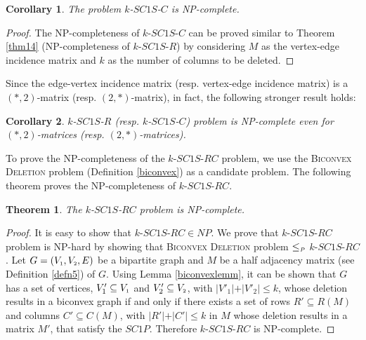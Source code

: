\documentclass[review, 1p]{elsarticle}
\newtheorem{theorem}{Theorem}
\newtheorem{corollary}{Corollary}
\begin{document}
\begin{corollary}
The problem $k$-$SC1S$-$C$ is NP-complete.
\end{corollary}
\begin{proof}
The NP-completeness of $k$-$SC1S$-$C$ can be proved similar to Theorem \ref{thm14} (NP-completeness of $k$-$SC1S$-$R$) by considering $M$ as the vertex-edge incidence matrix and $k$ as the number of columns to be deleted. 
\end{proof}
\noindent Since the edge-vertex incidence matrix (resp. vertex-edge incidence matrix) is a $(*,2)$-matrix (resp. $(2,*)$-matrix), in fact, the following stronger result holds: \begin{corollary}
$k$-$SC1S$-$R$ (resp. $k$-$SC1S$-$C$) problem is NP-complete even for $(*,2)$-matrices (resp. $(2,*)$-matrices).
\end{corollary}
\noindent To prove the NP-completeness of the $k$-$SC1S$-$RC$ problem, we use the \textsc{Biconvex Deletion} problem (Definition \ref{biconvex}) as a candidate problem. The following theorem proves the NP-completeness of $k$-$SC1S$-$RC$. 
\begin{theorem}
The $k$-$SC1S$-$RC$ problem is NP-complete.
\end{theorem}
\begin{proof}
It is easy to show that $k$-$SC1S$-$RC \in NP$. We prove that $k$-$SC1S$-$RC$ problem is NP-hard by showing that \textsc{Biconvex Deletion} problem $\leq_{\mathsmaller {P}}$  $k$-$SC1S$-$RC$. Let $G=(V_{\mathsmaller{1}}, V_{\mathsmaller{2}}, E)$ be a bipartite graph and $M$ be a half adjacency matrix (see Definition \ref{defn5}) of $G$. Using Lemma \ref{biconvexlemm}, it can be shown that $G$ has a set of vertices, $V'_{1} \subseteq V_{\mathsmaller{1}}$ and $V'_{2} \subseteq V_{\mathsmaller{2}}$, with $\vert V'_{1} \vert + \vert V'_{2} \vert \leq k$, whose deletion results in a biconvex graph if and only if there exists a set of rows $R' \subseteq R(M)$ and columns $C' \subseteq C(M)$, with $\vert R' \vert + \vert C' \vert \leq k$ in $M$ whose deletion results in a matrix $M'$, that satisfy the $SC1P$. Therefore $k$-$SC1S$-$RC$ is NP-complete.  
\end{proof}
\end{document}
